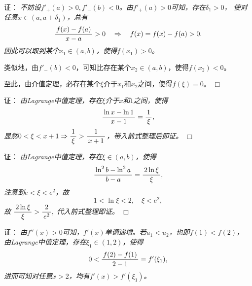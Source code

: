 \begin{frame}
	\linespread{1.5}
	\pause
	
	\bigskip
	
	\small 证：\it
	不妨设$f'_+(a)>0,f'_-(b)<0$。由$f'_+(a)>0$可知，存在$\delta_1>0$，
	使对任意$x\in(a,a+\delta_1)$，总有
	$$\displaystyle\frac{\,{f(x)-f(a)}\,}{\,{x-a}\,}>0\quad\Rightarrow
	\quad f(x)=f(x)-f(a)>0.$$
	因此可以取到某个$x_1\in(a,b)$，使得$f(x_1)>0$。
	
	\pause 类似地，由$f'_-(b)<0$，可知比存在某个$x_2\in(a,b)$，使得$f(x_2)<0$。
	
	\pause 至此，由介值定理，必存在某个$\xi$介于$x_1$和$x_2$之间，使得$f(\xi)=0$。
	\hfill$\Box$
\end{frame}

\begin{frame}
	\linespread{1.5}
	\pause
	
	\bigskip
	
	\small 证：\it
	由Lagrange中值定理，存在$\xi$介于$x$和$1$之间，使得
	$$\displaystyle\frac{\,{\ln x-\ln 1}\,}{\,{x-1}\,}=\displaystyle\frac{\,{1}\,}{\,{\xi}\,},$$
	\pause 显然$0<\xi<x+1\Rightarrow\displaystyle\frac{\,{1}\,}{\,{\xi}\,}>\displaystyle\frac{\,{1}\,}{\,{x+1}\,}$，带入前式整理后即证。
	\hfill$\Box$
\end{frame}

\begin{frame}
	\linespread{1.5}
	\pause
	
	\bigskip
	
	\small 证：\it
	由Lagrange中值定理，存在$\xi\in(a,b)$，使得
	$$\displaystyle\frac{\,{\ln^2b-\ln^2a}\,}{\,{b-a}\,}=\displaystyle\frac{\,{2\ln\xi}\,}{\,{\xi}\,},$$
	注意到$e<\xi<e^2$，故
	$$1<\ln\xi<2,\quad \xi<e^2,$$
	故
	$\displaystyle\frac{\,{2\ln\xi}\,}{\,{\xi}\,}>\displaystyle\frac{\,{2}\,}{\,{e^2}\,},$
	代入前式整理即证。
	\hfill$\Box$
\end{frame}

\begin{frame}
	\linespread{1.5}
	\pause
	
	\bigskip
	
	\small 证：\it
	由$f''(x)>0$可知，$f'(x)$单调递增。若$u_1<u_2$，也即$f(1)<f(2)$，
	由Lagrange中值定理，存在$\xi_1\in(1,2)$，使得
	$$0<\displaystyle\frac{\,{f(2)-f(1)}\,}{\,{2-1}\,}=f'(\xi_1),$$
	进而可知对任意$x>2$，均有$f'(x)>f'(\xi_1)$。
\end{frame}

